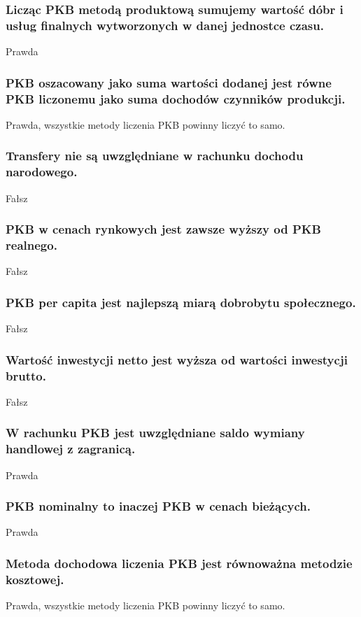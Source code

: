 \documentclass[a4paper,12pt]{article}
\begin{document}
\subsubsection{Licząc PKB metodą produktową sumujemy wartość dóbr i usług finalnych wytworzonych w danej jednostce czasu.}

Prawda

\subsubsection{PKB oszacowany jako suma wartości dodanej jest równe PKB liczonemu jako suma dochodów czynników produkcji.}
Prawda, wszystkie metody liczenia PKB powinny liczyć to samo.

\subsubsection{Transfery nie są uwzględniane w rachunku dochodu narodowego.}
Fałsz

\subsubsection{PKB w cenach rynkowych jest zawsze wyższy od PKB realnego.}
Fałsz

\subsubsection{PKB per capita jest najlepszą miarą dobrobytu społecznego.}

Fałsz

\subsubsection{Wartość inwestycji netto jest wyższa od wartości inwestycji brutto.}
Fałsz

\subsubsection{W rachunku PKB jest uwzględniane saldo wymiany handlowej z zagranicą.}
Prawda

\subsubsection{PKB nominalny to inaczej PKB w cenach bieżących.}
Prawda

\subsubsection{Metoda dochodowa liczenia PKB jest równoważna metodzie kosztowej.}
Prawda, wszystkie metody liczenia PKB powinny liczyć to samo.
\end{document}
